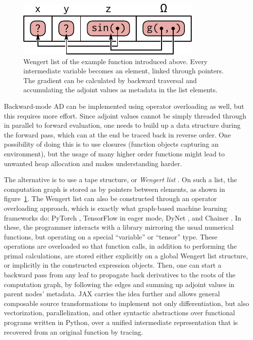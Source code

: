 \begin{figure}[t]
  \centering
  \includegraphics{figures/wengert-list}
  \caption{Wengert list of the example function \protect{} introduced above.
    Every intermediate variable becomes an element, linked through pointers.  The gradient can be
    calculated by backward traversal and accumulating the adjoint values as metadata in the list
    elements.}
  \label{fig:wengert-list}
\end{figure}

Backward-mode AD can be implemented using operator overloading as well, but this requires more
effort.  Since adjoint values cannot be simply threaded through in parallel to forward evaluation,
one needs to build up a data structure during the forward pass, which can at the end be traced back
in reverse order.  One possibility of doing this is to use closures (function objects capturing an
environment), but the usage of many higher order functions might lead to unwanted heap allocation
and makes understanding harder.

The alternative is to use a tape structure, or \emph{Wengert list} \parencite[][section
3]{baydin2018automatic}.  On such a list, the computation graph is stored as by pointers between
elements, as shown in figure~\ref{fig:wengert-list}.  The Wengert list can also be constructed
through an operator overloading approach, which is exactly what graph-based machine learning
frameworks do: PyTorch \parencite{paszke2017automatic}, TensorFlow \parencite{abadi2015tensorflow}
in eager mode, DyNet \parencite{neubig2017dynet}, and Chainer \parencite{tokui2015chainer}.  In
these, the programmer interacts with a library mirroring the usual numerical functions, but
operating on a special \enquote{variable} or \enquote{tensor} type.  These operations are overloaded
so that function calls, in addition to performing the primal calculations, are stored either
explicitly on a global Wengert list structure, or implicitly in the constructed expression objects.
Then, one can start a backward pass from any leaf to propagate back derivatives to the roots of the
computation graph, by following the edges and summing up adjoint values in parent nodes' metadata.
JAX \parencite{bradbury2018jax} carries the idea further and allows general composable source
transformations to implement not only differentiation, but also vectorization, parallelization, and
other syntactic abstractions over functional programs written in Python, over a unified intermediate
representation that is recovered from an original function by tracing.

